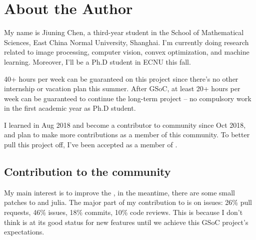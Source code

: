 
\section{About the Author}\label{sec:about_author}

My name is \textsf{Jiuning Chen}, a third-year student in the School of Mathematical Sciences, East China Normal University, Shanghai. I'm currently doing research related to image processing, computer vision, convex optimization, and machine learning. Moreover, I'll be a Ph.D student in ECNU this fall. \par

40+ hours per week can be guaranteed on this project since there's no other internship or vacation plan this summer. After GSoC, at least 20+ hours per week can be guaranteed to continue the long-term \images{}  project -- no compulsory work in the first academic year as Ph.D student. \par

I learned \langjulia in Aug 2018 and become a contributor to \langjulia community since Oct 2018, and plan to make more contributions as a member of this community. To better pull this project off, I've been accepted as a member of \juliaimages.

\subsection*{Contribution to the community}
My main interest is to improve the \images, in the meantime, there are some small patches to \flux{} and \textsf{julia}. The major part of my contribution to \textsf{\juliaimages} is on issues: 26\% pull requests, 46\% issues, 18\% commits, 10\% code reviews. This is because I don't think \images{} is at its good status for new features until we achieve this GSoC project's expectations.

